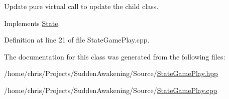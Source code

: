 Update pure virtual call to update the child class. 



Implements \hyperlink{class_state_a43d4ca30d927c023316c058b700c0716}{State}.



Definition at line 21 of file State\-Game\-Play.\-cpp.



The documentation for this class was generated from the following files\-:\begin{DoxyCompactItemize}
\item 
/home/chris/\-Projects/\-Sudden\-Awakening/\-Source/\hyperlink{_state_game_play_8hpp}{State\-Game\-Play.\-hpp}\item 
/home/chris/\-Projects/\-Sudden\-Awakening/\-Source/\hyperlink{_state_game_play_8cpp}{State\-Game\-Play.\-cpp}\end{DoxyCompactItemize}

